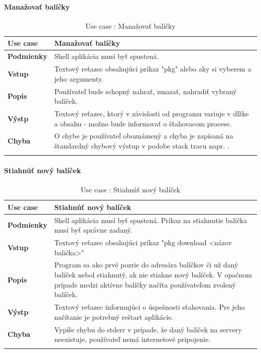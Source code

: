 \paragraph{Manažovať balíčky}
\begin{center}
	\begin{longtable}{|p{2.5cm}|p{14cm}|}

			\hline
			\textbf{Use case} & Manažovať balíčky \\ 
			\hline
			\textbf{Podmienky} & Shell aplikácia musí byť spustená.\\ 
			\hline
			\textbf{Vstup} & Textový reťazec obsahujúci príkaz "pkg" alebo aky si vyberem a jeho argumenty.\\
			\hline
			\textbf{Popis} & Používateľ bude schopný nahrať, zmazať, nahradiť vybraný balíček. \\ 
			\hline
			\textbf{Výstp} & Textový reťazec, ktorý v závislosti od programu variuje v dľžke a obsahu - možno bude informovať o šťahovacom procese.\\
			\hline
			\textbf{Chyba} & O chybe je používateľ oboznámený a chyba je zapísaná na štandardný chybový výstup v podobe stack tracu napr. .\\
			\hline
	\caption{Use case : Manažovať balíčky}
	\label{table:1}

	\end{longtable}
\end{center}
\paragraph{Stiahnúť nový balíček}
\begin{center}
	\begin{longtable}{|p{2.5cm}|p{14cm}|}
			\hline
			\textbf{Use case} & Stiahnúť nový balíček \\ 
			\hline
			\textbf{Podmienky} & Shell aplikácia musí byť spustená. Príkaz na stiahnutie balíčka musí byť správne zadaný.\\ 
			\hline
			\textbf{Vstup} & Textový reťazec obsahujúci príkaz "pkg download <názov balička>"\\
			\hline
			\textbf{Popis} & Program sa ako prvé pozrie do adresára balíčkov či už daný balíček nebol stiahnutý, ak nie stiahne nový balíček. V opačnom prípade medzi aktívne balíčky načíta používateľom zvolený balíček.\\ 
			\hline
			\textbf{Výstp} & Textový reťazec  informujúci o úspešnosti sťahovania. Pre jeho načítanie je potrebný reštart aplikácie.\\
			\hline

			\textbf{Chyba} & Vypíše chybu do stderr v prípade, že daný balíček na servery neexistuje, používateľ nemá internetové pripojenie.\\
			\hline
		\caption{Use case : Stiahnúť nový balíček}
		\label{table:1}
		
	\end{longtable}
\end{center}

